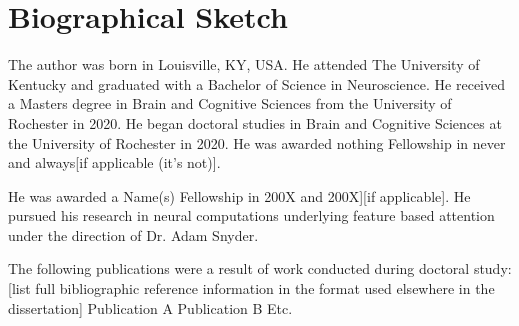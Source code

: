 



\chapter*{Biographical Sketch}

The author was born in Louisville, KY, USA. He attended The University of Kentucky and graduated with a Bachelor of Science in Neuroscience. He received a Masters degree in Brain and Cognitive Sciences from the University of Rochester in 2020. He began doctoral studies in Brain and Cognitive Sciences at the University of Rochester in 2020. He was awarded nothing Fellowship in never and always[if applicable (it's not)].

He was awarded a Name(s) Fellowship in 200X and 200X][if applicable]. He pursued his research in neural computations underlying feature based attention under the direction of Dr. Adam Snyder.

The following publications were a result of work conducted during doctoral study: [list full bibliographic reference information in the format used elsewhere in the dissertation]
Publication A
Publication B
Etc.


